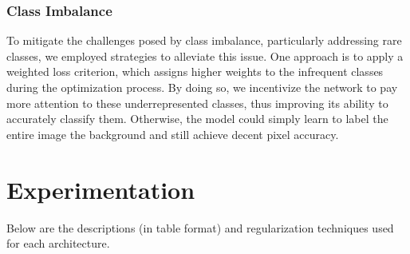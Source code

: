 \subsubsection*{Class Imbalance}
To mitigate the challenges posed by class imbalance, particularly addressing rare classes, we employed strategies to alleviate this issue. One approach is to apply a weighted loss criterion, which assigns higher weights to the infrequent classes during the optimization process. By doing so, we incentivize the network to pay more attention to these underrepresented classes, thus improving its ability to accurately classify them. Otherwise, the model could simply learn to label the entire image the background and still achieve decent pixel accuracy.

\section*{Experimentation}

Below are the descriptions (in table format) and regularization techniques used for each architecture.

